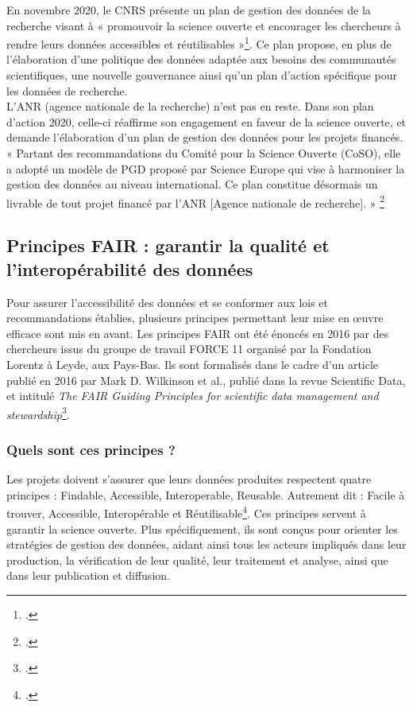 En novembre 2020, le CNRS présente un plan de gestion des données de la recherche visant à « promouvoir la science ouverte et encourager les chercheurs à rendre leurs données accessibles et réutilisables »\footcite{ScienceOuverteCNRS}. Ce plan propose, en plus de l'élaboration d'une politique des données adaptée aux besoins des communautés scientifiques, une nouvelle gouvernance ainsi qu'un plan d'action spécifique pour les données de recherche.\\

L'ANR (agence nationale de la recherche) n'est pas en reste. Dans son plan d'action 2020, celle-ci réaffirme son engagement en faveur de la science ouverte, et demande l'élaboration d'un plan de gestion des données pour les projets financés. « Partant des recommandations du Comité pour la Science Ouverte (CoSO), elle a adopté un modèle de PGD proposé par Science Europe qui vise à harmoniser la gestion des données au niveau international. Ce plan constitue désormais un livrable de tout projet financé par l’ANR [Agence nationale de recherche]. » \footcite{hadrossekGuideBonnesPratiques}

        
        \subsection{Principes FAIR : garantir la qualité et l’interopérabilité des données}

Pour assurer l'accessibilité des données et se conformer aux lois et recommandations établies, plusieurs principes permettant leur mise en œuvre efficace sont mis en avant. Les principes FAIR ont été énoncés en 2016 par des chercheurs issus du groupe de travail FORCE 11 organisé par la Fondation Lorentz à Leyde, aux Pays-Bas. Ils sont formalisés dans le cadre d'un article publié en 2016 par Mark D. Wilkinson et al., publié dans la revue Scientific Data, et intitulé \emph{The FAIR Guiding Principles for scientific data management and stewardship}\footcite{wilkinsonFAIRGuidingPrinciples2016}.

            \subsubsection{Quels sont ces principes ?}

Les projets doivent s’assurer que leurs données produites respectent quatre principes : Findable, Accessible, Interoperable, Reusable. Autrement dit : Facile à trouver, Accessible, Interopérable et Réutilisable\footcite{elisaCommentElaborerPlan2022}. Ces principes servent à garantir la science ouverte. Plus spécifiquement, ils sont conçus pour orienter les stratégies de gestion des données, aidant ainsi tous les acteurs impliqués dans leur production, la vérification de leur qualité, leur traitement et analyse, ainsi que dans leur publication et diffusion.

